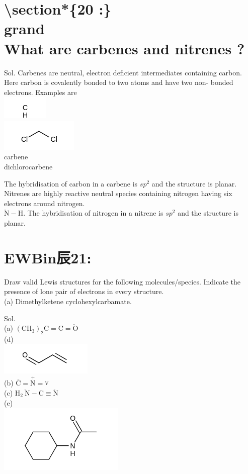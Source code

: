 \documentclass[10pt]{article}
\begin{document}
\section*{\textbackslash section*\{20 :\} \\
 grand \\
 What are carbenes and nitrenes ?}
Sol. Carbenes are neutral, electron deficient intermediates containing carbon. Here carbon is covalently bonded to two atoms and have two non- bonded electrons. Examples are\\
\includegraphics{smile-4914f60407a7397e7cbe63463bd91bc2954afdf0}\\
\includegraphics{smile-2273bc41ecdfdbfa3973cc7696cc6a32aeeaf97b}\\
carbene\\
dichlorocarbene

The hybridisation of carbon in a carbene is $s p^{2}$ and the structure is planar. Nitrenes are highly reactive neutral species containing nitrogen having six electrons around nitrogen.\\
$\ddot{\mathrm{N}}-\mathrm{H}$. The hybridisation of nitrogen in a nitrene is $s p^{2}$ and the structure is planar.

\section*{EWBin辰21:}
Draw valid Lewis structures for the following molecules/species. Indicate the presence of lone pair of electrons in every structure.\\
(a) Dimethylketene cyclohexylcarbamate.

Sol.\\
(a) $\left(\mathrm{CH}_{3}\right)_{2} \mathrm{C}=\mathrm{C}=\ddot{\mathrm{O}}$\\
(d)\\
\includegraphics{smile-1f5f177a6caef38c8c05f642e0eabe58ea4bdc24}\\
(b) $\overline{\mathrm{C}}=\stackrel{+}{\mathrm{N}}=\stackrel{\mathrm{V}}{ }$\\
(c) $\mathrm{H}_{2} \ddot{\mathrm{~N}}-\mathrm{C} \equiv \ddot{\mathrm{N}}$\\
(e)\\
\includegraphics{smile-81d4416c11e3bba588d40ce53151a9c1138670e9}
\end{document}
